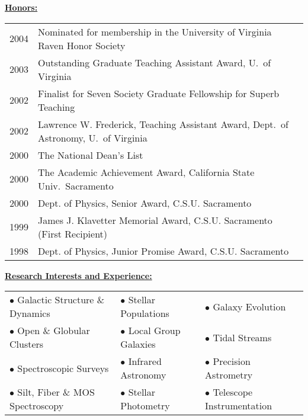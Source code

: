 \documentclass[12pt]{article}
\begin{document}
\noindent \underline{\bf Honors:} \\
\begin{tabular}{ll}
2004 &  Nominated for membership in the University of Virginia Raven Honor Society \\
2003 &  Outstanding Graduate Teaching Assistant Award, U.\ of Virginia \\%
2002 &  Finalist for Seven Society Graduate Fellowship for Superb Teaching \\
2002 &  Lawrence W. Frederick, Teaching Assistant Award, Dept.\ of Astronomy, U.\ of Virginia \\%
2000 &  The National Dean's List  \\
2000 &  The Academic Achievement Award, California State Univ.\ Sacramento \\
2000 &  Dept. of Physics, Senior Award, C.S.U. Sacramento \\%
1999 &  James J. Klavetter Memorial Award, C.S.U. Sacramento (First Recipient) \\%
1998 &  Dept. of Physics, Junior Promise Award, C.S.U. Sacramento \\%
\end{tabular}
\clearpage
\noindent \underline{\bf Research Interests and Experience:} \\
\begin{tabular}{lll}
$\bullet$ Galactic Structure \& Dynamics  & $\bullet$ Stellar Populations  & $\bullet$ Galaxy Evolution\\
$\bullet$ Open \& Globular Clusters       & $\bullet$ Local Group Galaxies & $\bullet$ Tidal Streams\\
$\bullet$ Spectroscopic Surveys           & $\bullet$ Infrared Astronomy   & $\bullet$ Precision Astrometry \\ 
$\bullet$ Silt, Fiber \& MOS Spectroscopy & $\bullet$ Stellar Photometry   & $\bullet$ Telescope Instrumentation  \\
\end{tabular}
\vskip 0.06in
\end{document}
